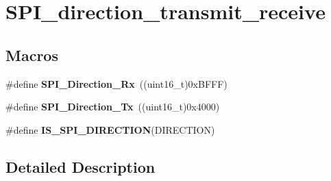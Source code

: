 \hypertarget{group___s_p_i__direction__transmit__receive}{\section{S\-P\-I\-\_\-direction\-\_\-transmit\-\_\-receive}
\label{group___s_p_i__direction__transmit__receive}
}
\subsection*{Macros}
\begin{DoxyCompactItemize}
\item 
\hypertarget{group___s_p_i__direction__transmit__receive_ga9a59d225a8cf42eebafbec6ad95c078c}{\#define {\bfseries S\-P\-I\-\_\-\-Direction\-\_\-\-Rx}~((uint16\-\_\-t)0x\-B\-F\-F\-F)}\label{group___s_p_i__direction__transmit__receive_ga9a59d225a8cf42eebafbec6ad95c078c}

\item 
\hypertarget{group___s_p_i__direction__transmit__receive_gabd76982a7e305c13f7ad8ea1789d3c0c}{\#define {\bfseries S\-P\-I\-\_\-\-Direction\-\_\-\-Tx}~((uint16\-\_\-t)0x4000)}\label{group___s_p_i__direction__transmit__receive_gabd76982a7e305c13f7ad8ea1789d3c0c}

\item 
\#define {\bfseries I\-S\-\_\-\-S\-P\-I\-\_\-\-D\-I\-R\-E\-C\-T\-I\-O\-N}(D\-I\-R\-E\-C\-T\-I\-O\-N)
\end{DoxyCompactItemize}


\subsection{Detailed Description}


